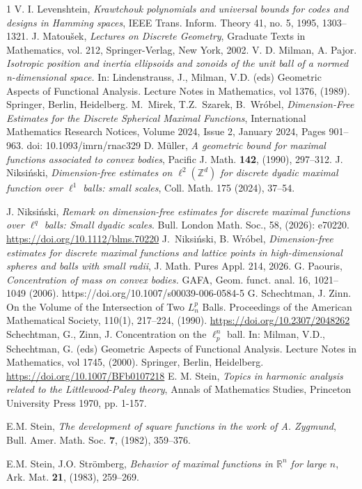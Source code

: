 \documentclass[a4paper,oneside, reqno]{amsart}
\numberwithin{equation}{section}
\theoremstyle{definition}%
\theoremstyle{definition}
\theoremstyle{definition}%
\theoremstyle{definition}
\newcommand{\Z}{\mathbb{Z}}
\begin{document}
\begin{thebibliography}{1}
V. I. Levenshtein,
\emph{Krawtchouk polynomials and universal bounds for codes and designs in Hamming spaces},
IEEE Trans. Inform. Theory 41, no. 5, 1995, 1303--1321.
 J. Matoušek, \textit{Lectures on Discrete Geometry}, Graduate Texts in Mathematics, vol. 212, Springer-Verlag, New York, 2002.
V. D. Milman, A. Pajor. \textit{Isotropic position and inertia ellipsoids and zonoids of the unit ball of a normed n-dimensional space.} In: Lindenstrauss, J., Milman, V.D. (eds) Geometric Aspects of Functional Analysis. Lecture Notes in Mathematics, vol 1376, (1989). Springer, Berlin, Heidelberg.
  M.\ Mirek, T.Z.\ Szarek, B.\ Wr\'obel,
\emph{Dimension-Free Estimates for the Discrete Spherical Maximal Functions}, International Mathematics Research Notices, Volume 2024, Issue 2, January 2024, Pages 901–963. doi: 10.1093/imrn/rnac329
D. M\"uller, 
\textit{A geometric bound for maximal
  functions associated to convex bodies}, 
	Pacific J. Math. {\bf 142}, (1990), 297--312.
J. Niksiński,
\textit{Dimension-free estimates on $\ell^2(\Z^d)$ for discrete dyadic maximal function over $\ell^1$ balls: small scales},
Coll. Math. 175 (2024), 37--54.

J. Niksiński, \textit{Remark on dimension-free estimates for discrete maximal functions over $\ell^q$ balls: Small dyadic scales}. Bull. London Math. Soc., 58, (2026): e70220. \url{https://doi.org/10.1112/blms.70220}
 J.~Niksi{\'n}ski, B. Wr\'obel,
	\textit{Dimension-free estimates for discrete maximal functions and lattice points in high-dimensional spheres and balls with small radii}, J. Math. Pures Appl. 214, 2026.
G. Paouris, \textit{Concentration of mass on convex bodies.} GAFA, Geom. funct. anal. 16, 1021–1049 (2006). https://doi.org/10.1007/s00039-006-0584-5
G. Schechtman, J. Zinn. On the Volume of the Intersection of Two $L_n^p$ Balls. Proceedings of the American Mathematical Society, 110(1), 217–224, (1990). \url{https://doi.org/10.2307/2048262}
Schechtman, G., Zinn, J. Concentration on the $\ell^n_p$  ball. In: Milman, V.D., Schechtman, G. (eds) Geometric Aspects of Functional Analysis. Lecture Notes in Mathematics, vol 1745, (2000). Springer, Berlin, Heidelberg. \url{https://doi.org/10.1007/BFb0107218}
 E. M. Stein, \emph{Topics in harmonic analysis
  related to the Littlewood-Paley theory}, Annals of Mathematics
Studies, Princeton University Press 1970, pp. 1-157.

E.M. Stein, 
\textit{The development of square
  functions in the work of A. Zygmund}, 
	Bull.  Amer. Math. Soc. {\bf 7}, (1982), 359--376.
	

E.M. Stein, J.O. Str\"omberg, 
\textit{Behavior of maximal functions in $\mathbb{R}^n$ for large $n$}, 
Ark. Mat. {\bf 21}, (1983), 259--269.

\end{thebibliography}
\end{document}
